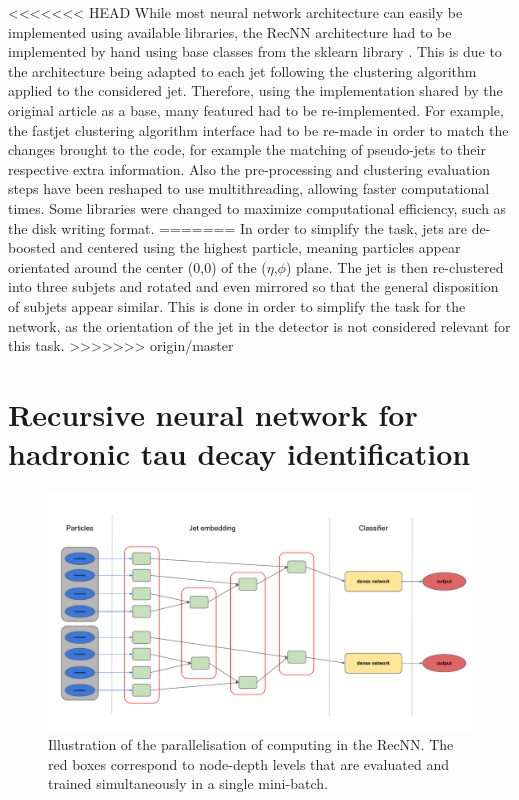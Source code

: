 <<<<<<< HEAD
While most neural network architecture can easily be implemented using available libraries, the RecNN architecture had to be implemented by hand using base classes from the sklearn library \cite{scikit-learn}. This is due to the architecture being adapted to each jet following the clustering algorithm applied to the considered jet. Therefore, using the implementation shared by the original article \cite{Louppe:2017ipp} as a base, many featured had to be re-implemented. For example, the fastjet \cite{Cacciari:2011ma} clustering algorithm interface had to be re-made in order to match the changes brought to the code, for example the matching of pseudo-jets to their respective extra information. Also the pre-processing and clustering evaluation steps have been reshaped to use multithreading, allowing faster computational times. Some libraries were changed to maximize computational efficiency, such as the disk writing format.
=======
In order to simplify the task, jets are de-boosted and centered using the highest \pt particle, meaning particles appear orientated around the center (0,0) of the ($\eta$,$\phi$) plane. The jet is then re-clustered into three subjets and rotated and even mirrored so that the general disposition of subjets appear similar. This is done in order to simplify the task for the network, as the orientation of the jet in the detector is not considered relevant for this task.
>>>>>>> origin/master

\section{Recursive neural network for hadronic tau decay identification}


\begin{figure}
    \centering
    \includegraphics[width=\textwidth]{Images/RecNN_diagram_parall1.pdf}
    \caption{Illustration of the parallelisation of computing in the RecNN. The red boxes correspond to node-depth levels that are evaluated and trained simultaneously in a single mini-batch.}
    \label{fig:RecNN_parall}
\end{figure}



